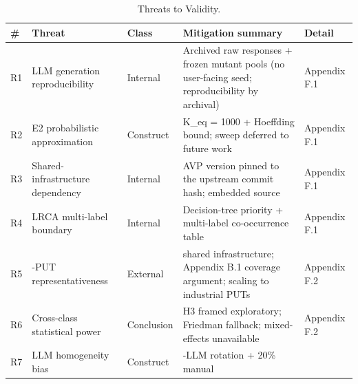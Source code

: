 \documentclass[review,12pt,authoryear]{elsarticle}
\begin{document}
{\def\LTcaptype{table} %
\begin{longtable}[]{@{}
  >{\raggedright\arraybackslash}p{}
  >{\raggedright\arraybackslash}p{}
  >{\raggedright\arraybackslash}p{}
  >{\raggedright\arraybackslash}p{}
  >{\raggedright\arraybackslash}p{}@{}}
\caption{Threats to Validity.}\label{tab:p2-14}\\
\toprule\noalign{}
\begin{minipage}[b]{\linewidth}\raggedright
\#
\end{minipage} & \begin{minipage}[b]{\linewidth}\raggedright
Threat
\end{minipage} & \begin{minipage}[b]{\linewidth}\raggedright
Class
\end{minipage} & \begin{minipage}[b]{\linewidth}\raggedright
Mitigation summary
\end{minipage} & \begin{minipage}[b]{\linewidth}\raggedright
Detail
\end{minipage} \\
\midrule\noalign{}
\endfirsthead
\endhead
\bottomrule\noalign{}
\endlastfoot
R1 & LLM generation reproducibility & Internal & Archived raw responses
+ frozen mutant pools (no user-facing seed; reproducibility by archival) & Appendix F.1 \\
R2 & E2 probabilistic approximation & Construct & K\_eq = 1000 +
Hoeffding bound; sweep deferred to future work & Appendix F.1 \\
R3 & Shared-infrastructure dependency & Internal & AVP version pinned to the upstream
commit hash; embedded source & Appendix F.1 \\
R4 & LRCA multi-label boundary & Internal & Decision-tree priority +
multi-label co-occurrence table & Appendix F.1 \\
R5 & 12-PUT representativeness & External & shared infrastructure; Appendix B.1
coverage argument; scaling to industrial PUTs & Appendix F.2 \\
R6 & Cross-class statistical power & Conclusion & H3 framed exploratory;
Friedman fallback; mixed-effects unavailable & Appendix F.2 \\
R7 & LLM homogeneity bias & Construct & 3-LLM rotation + 20\% manual

\end{longtable}}
\end{document}
